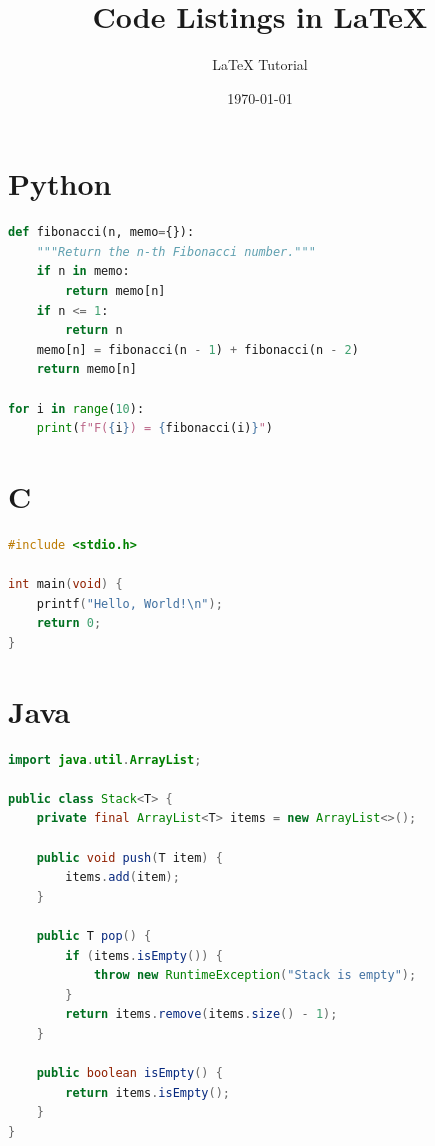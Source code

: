 \documentclass[12pt]{article}
\title{Code Listings in \LaTeX{}}
\author{LaTeX Tutorial}
\date{\today}
\begin{document}
\maketitle

\section{Python}

\begin{lstlisting}[language=Python, caption={Fibonacci with memoization}]
def fibonacci(n, memo={}):
    """Return the n-th Fibonacci number."""
    if n in memo:
        return memo[n]
    if n <= 1:
        return n
    memo[n] = fibonacci(n - 1) + fibonacci(n - 2)
    return memo[n]

for i in range(10):
    print(f"F({i}) = {fibonacci(i)}")
\end{lstlisting}

\section{C}

\begin{lstlisting}[language=C, caption={Hello World in C}]
#include <stdio.h>

int main(void) {
    printf("Hello, World!\n");
    return 0;
}
\end{lstlisting}

\section{Java}

\begin{lstlisting}[language=Java, caption={A simple generic stack}]
import java.util.ArrayList;

public class Stack<T> {
    private final ArrayList<T> items = new ArrayList<>();

    public void push(T item) {
        items.add(item);
    }

    public T pop() {
        if (items.isEmpty()) {
            throw new RuntimeException("Stack is empty");
        }
        return items.remove(items.size() - 1);
    }

    public boolean isEmpty() {
        return items.isEmpty();
    }
}
\end{lstlisting}
\end{document}
